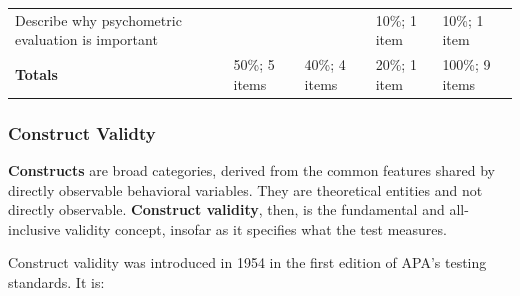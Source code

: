 \documentclass[
  english,
]{book}
\begin{document}
\begin{longtable}[]{@{}lllll@{}}
\begin{minipage}[t]{0.37\columnwidth}\raggedright
Describe why psychometric evaluation is important\strut
\end{minipage} & \begin{minipage}[t]{0.11\columnwidth}\raggedright
\strut
\end{minipage} & \begin{minipage}[t]{0.10\columnwidth}\raggedright
\strut
\end{minipage} & \begin{minipage}[t]{0.10\columnwidth}\raggedright
10\%; 1 item\strut
\end{minipage} & \begin{minipage}[t]{0.17\columnwidth}\raggedright
10\%; 1 item\strut
\end{minipage}\tabularnewline
\begin{minipage}[t]{0.37\columnwidth}\raggedright
\textbf{Totals}\strut
\end{minipage} & \begin{minipage}[t]{0.11\columnwidth}\raggedright
50\%; 5 items\strut
\end{minipage} & \begin{minipage}[t]{0.10\columnwidth}\raggedright
40\%; 4 items\strut
\end{minipage} & \begin{minipage}[t]{0.10\columnwidth}\raggedright
20\%; 1 item\strut
\end{minipage} & \begin{minipage}[t]{0.17\columnwidth}\raggedright
100\%; 9 items\strut
\end{minipage}\tabularnewline
\bottomrule
\end{longtable}

\hypertarget{construct-validty}{%
\subsubsection{Construct Validty}\label{construct-validty}}

\textbf{Constructs} are broad categories, derived from the common features shared by directly observable behavioral variables. They are theoretical entities and not directly observable. \textbf{Construct validity}, then, is the fundamental and all-inclusive validity concept, insofar as it specifies what the test measures.

Construct validity was introduced in 1954 in the first edition of APA's testing standards. It is:
\end{document}
